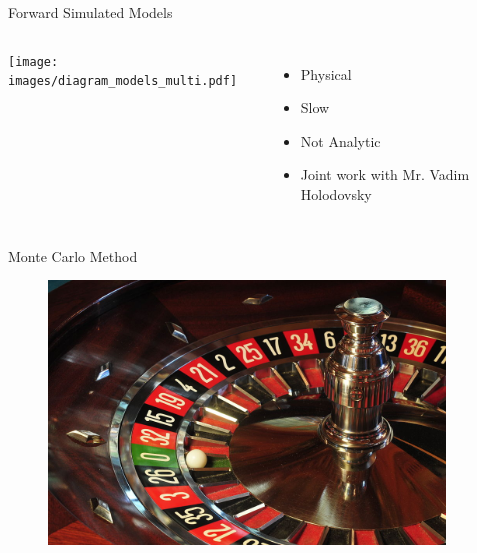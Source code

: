 \documentclass[compress,red,12pt]{beamer}
\begin{document}
\begin{frame}{Forward Simulated Models}
  \begin{columns}[C]
    \texttt{[image: images/diagram\_models\_multi.pdf]}

    \begin{itemize}
    \item Physical
    \item Slow
    \item Not Analytic
    \item Joint work with Mr. Vadim Holodovsky
    \end{itemize}
  \end{columns}
\end{frame}


\begin{frame}{Monte Carlo Method}
  \begin{figure}
    \centering
    \begin{overprint}
      {\centerline{\includegraphics[height=7cm]{images/roullete.jpg}}} %
      {\centerline{\def\svgwidth{0.9\linewidth}\small{}}}
      {\centerline{\def\svgwidth{0.9\linewidth}\small{}}}
      {\centerline{\def\svgwidth{0.9\linewidth}\small{}}}
      {\centerline{\def\svgwidth{0.9\linewidth}\small{}}}
      {\centerline{\def\svgwidth{0.9\linewidth}\small{}}}
      {\centerline{\def\svgwidth{0.9\linewidth}\small{}}}
      {\centerline{\def\svgwidth{0.9\linewidth}\small{}}}
      {\centerline{\def\svgwidth{0.9\linewidth}\small{}}}
      {\centerline{\def\svgwidth{0.9\linewidth}\small{}}}
    \end{overprint}
  \end{figure}
\end{frame}
\end{document}
